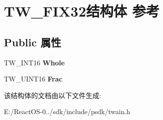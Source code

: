 \hypertarget{struct_t_w___f_i_x32}{}\section{T\+W\+\_\+\+F\+I\+X32结构体 参考}
\label{struct_t_w___f_i_x32}
\subsection*{Public 属性}
\begin{DoxyCompactItemize}
\item 
\mbox{\label{struct_t_w___f_i_x32_a0db7b6d9c0cbec563dae4dd6287f8c57}} 
T\+W\+\_\+\+I\+N\+T16 {\bfseries Whole}
\item 
\mbox{\label{struct_t_w___f_i_x32_ac5c35d301991c26d163d69d5933a453b}} 
T\+W\+\_\+\+U\+I\+N\+T16 {\bfseries Frac}
\end{DoxyCompactItemize}


该结构体的文档由以下文件生成\+:\begin{DoxyCompactItemize}
\item 
E\+:/\+React\+O\+S-\/0../sdk/include/psdk/twain.\+h\end{DoxyCompactItemize}
